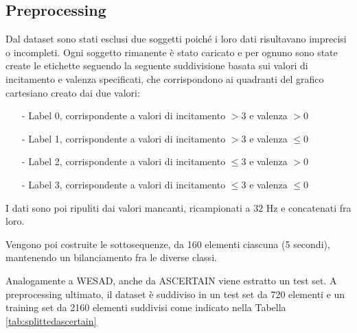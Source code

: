 \subsection{Preprocessing}
Dal dataset sono stati esclusi due soggetti poiché i loro dati risultavano imprecisi o incompleti. Ogni soggetto rimanente è stato caricato e per ognuno sono state create le etichette seguendo la seguente suddivisione basata sui valori di incitamento e valenza specificati, che corrispondono ai quadranti del grafico cartesiano creato dai due valori:
\begin{itemize}
    \item[-] Label 0, corrispondente a valori di incitamento $> 3$ e valenza $> 0$
    \item[-] Label 1, corrispondente a valori di incitamento $> 3$ e valenza $\leq 0$
    \item[-] Label 2, corrispondente a valori di incitamento $\leq 3$ e valenza $> 0$
    \item[-] Label 3, corrispondente a valori di incitamento $\leq 3$ e valenza $\leq 0$
\end{itemize}

I dati sono poi ripuliti dai valori mancanti, ricampionati a 32 Hz e concatenati fra loro.



Vengono poi costruite le sottosequenze, da 160 elementi ciascuna (5 secondi), mantenendo un bilanciamento fra le diverse classi.


Analogamente a WESAD, anche da ASCERTAIN viene estratto un test set. A preprocessing ultimato, il dataset è suddiviso in un test set da 720 elementi e un training set da 2160 elementi suddivisi come indicato nella Tabella \ref{tab:splittedascertain}

